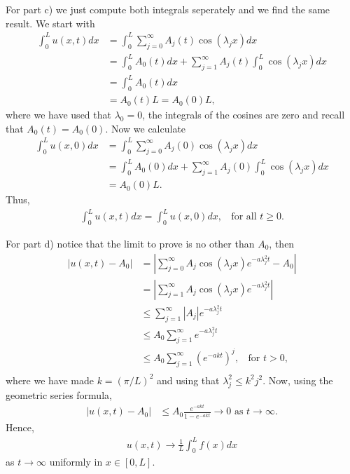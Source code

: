 \begin{questions}
\begin{solution}
For part c) we just compute both integrals seperately and we find the same result. We start with
\begin{align*}
\int_0^Lu(x,t)dx&=\int_0^L\sum_{j=0}^{\infty}A_j(t)\cos(\lambda_jx) dx\\
&=\int_0^LA_0(t)dx+\sum_{j=1}^{\infty}A_j(t)\int_0^L\cos(\lambda_jx) dx\\
&=\int_0^LA_0(t)dx\\
&=A_0(t)L=A_0(0)L,
\end{align*}
where we have used that $\lambda_0=0$, the integrals of the cosines are zero and recall that $A_0(t)=A_0(0)$.
Now we calculate
\begin{align*}
\int_0^Lu(x,0)dx&=\int_0^L\sum_{j=0}^{\infty}A_j(0)\cos(\lambda_jx) dx\\
&=\int_0^LA_0(0)dx+\sum_{j=1}^{\infty}A_j(0)\int_0^L\cos(\lambda_jx) dx\\
&=A_0(0)L.
\end{align*}
Thus,
\begin{align*}
\int_0^Lu(x,t)dx=\int_0^Lu(x,0)dx,~~~~\text{for all }t\geq 0.
\end{align*}

For part d) notice that the limit to prove is no other than $A_0$,
then
\begin{align*}
|u(x,t)-A_0|&=\left|\sum_{j=0}^{\infty}A_j\cos(\lambda_jx)e^{-a\lambda_j^2t}-A_0\right|\\
&=\left|\sum_{j=1}^{\infty}A_j\cos(\lambda_jx)e^{-a\lambda_j^2t}\right|\\
&\leq\sum_{j=1}^{\infty}\left|A_j\right|e^{-a\lambda_j^2t}\\
&\leq A_0\sum_{j=1}^{\infty}e^{-a\lambda_j^2t}\\
&\leq A_0\sum_{j=1}^{\infty}\left(e^{-akt}\right)^j,~~~~\text{for }t>0,\\
\end{align*}
where we have made $k=(\pi/L)^2$ and using that $\lambda_j^2\leq k^2j^2$. Now, using the geometric series formula,
\begin{align*}
|u(x,t)-A_0|&\leq A_0\frac{e^{-akt}}{1-e^{-akt}}\rightarrow 0\text{  as }t\rightarrow\infty.
\end{align*}
Hence,
\begin{align*}
u(x,t)\rightarrow \frac{1}{L}\int_0^Lf(x)dx
\end{align*}
as $t\rightarrow\infty$ uniformly in $x\in[0,L]$.
\end{solution}
\end{questions}
